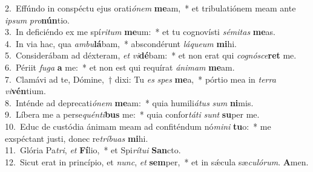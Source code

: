 {2.~}Effúndo in conspéctu ejus orati\textit{ó}\textit{nem} \textbf{me}am,~* et tribulatiónem meam ante \textit{i}\textit{psum} \textit{pro}\textbf{nún}tio.\\
{3.~}In deficiéndo ex me spí\textit{ri}\textit{tum} \textbf{me}um:~* et tu cognovísti \textit{sé}\textit{mi}\textit{tas} \textbf{me}as.\\
{4.~}In via hac, qua \textit{am}\textit{bu}\textbf{lá}bam,~* abscondérunt \textit{lá}\textit{que}\textit{um} \textbf{mi}hi.\\
{5.~}Considerábam ad déxteram, \textit{et} \textit{vi}\textbf{dé}bam:~* et non erat qui \textit{co}\textit{gnó}\textit{sce}\textbf{ret} me.\\
{6.~}Périit \textit{fu}\textit{ga} \textbf{a} me:~* et non est qui requírat \textit{á}\textit{ni}\textit{mam} \textbf{me}am.\\
{7.~}Clamávi ad te, Dómine,~† dixi: Tu \textit{es} \textit{spes} \textbf{me}a,~* pórtio mea in \textit{ter}\textit{ra} \textit{vi}\textbf{vén}tium.\\
{8.~}Inténde ad deprecati\textit{ó}\textit{nem} \textbf{me}am:~* quia humili\textit{á}\textit{tus} \textit{sum} \textbf{ni}mis.\\
{9.~}Líbera me a perse\textit{quén}\textit{ti}\textbf{bus} me:~* quia confor\textit{tá}\textit{ti} \textit{sunt} \textbf{su}per me.\\
{10.~}Educ de custódia ánimam meam ad confiténdum nó\textit{mi}\textit{ni} \textbf{tu}o:~* me exspéctant justi, donec re\textit{trí}\textit{bu}\textit{as} \textbf{mi}hi.\\
{11.~}Glória Pa\textit{tri}, \textit{et} \textbf{Fí}lio,~* et Spi\textit{rí}\textit{tu}\textit{i} \textbf{San}cto.\\
{12.~}Sicut erat in princípio, et \textit{nunc}, \textit{et} \textbf{sem}per,~* et in sǽcula sæ\textit{cu}\textit{ló}\textit{rum}. \textbf{A}men.\\
